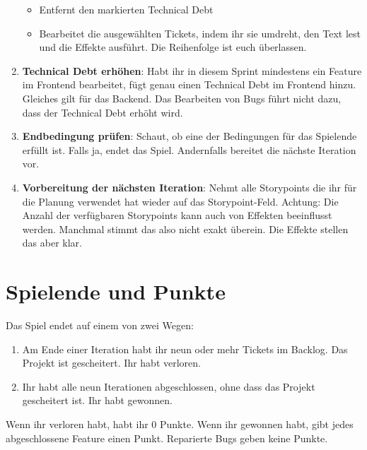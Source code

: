 \documentclass[a4paper, 11pt]{scrartcl}
\begin{document}
\begin{enumerate}
\begin{itemize}
        \item Entfernt den markierten Technical Debt
        \item Bearbeitet die ausgewählten Tickets, indem ihr sie umdreht, den Text lest und die Effekte ausführt. Die Reihenfolge ist euch überlassen.
    \end{itemize}
    \item \textbf{Technical Debt erhöhen}: Habt ihr in diesem Sprint mindestens ein Feature im Frontend bearbeitet, fügt genau einen Technical Debt im Frontend hinzu. Gleiches gilt für das Backend. Das Bearbeiten von Bugs führt nicht dazu, dass der Technical Debt erhöht wird.
    \item \textbf{Endbedingung prüfen}: Schaut, ob eine der Bedingungen für das Spielende erfüllt ist. Falls ja, endet das Spiel. Andernfalls bereitet die nächste Iteration vor.
    \item \textbf{Vorbereitung der nächsten Iteration}: Nehmt alle Storypoints die ihr für die Planung verwendet hat wieder auf das Storypoint-Feld. Achtung: Die Anzahl der verfügbaren Storypoints kann auch von Effekten beeinflusst werden. Manchmal stimmt das also nicht exakt überein. Die Effekte stellen das aber klar.
\end{enumerate}

\section*{Spielende und Punkte}

Das Spiel endet auf einem von zwei Wegen:

\begin{enumerate}
    \item Am Ende einer Iteration habt ihr neun oder mehr Tickets im Backlog. Das Projekt ist gescheitert. Ihr habt verloren.
    \item Ihr habt alle neun Iterationen abgeschlossen, ohne dass das Projekt gescheitert ist. Ihr habt gewonnen.
\end{enumerate}

\noindent Wenn ihr verloren habt, habt ihr 0 Punkte. Wenn ihr gewonnen habt, gibt jedes abgeschlossene Feature einen Punkt. Reparierte Bugs geben keine Punkte.
\end{document}
